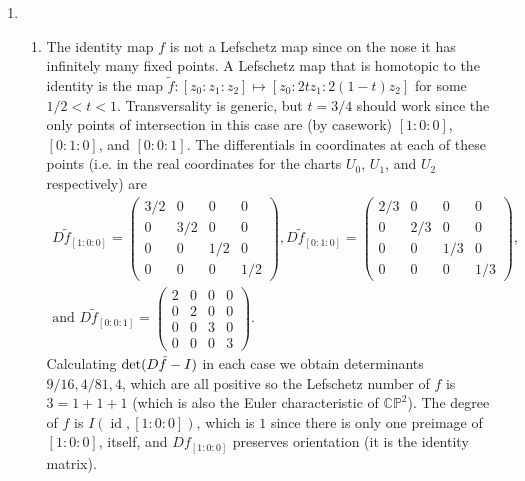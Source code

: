 \documentclass[11pt,leqno]{article}
\theoremstyle{plain}
\theoremstyle{definition}
\numberwithin{equation}{section}
\numberwithin{lem}{section}
\DeclareMathOperator{\id}{id}
\begin{document}
\begin{enumerate}
    \item \begin{enumerate}
        \item The identity map $f$ is not a Lefschetz map since on the nose it has infinitely many fixed points. A Lefschetz map that is homotopic to the identity is the map $\tilde f\colon [z_0:z_1:z_2]\mapsto [z_0:2tz_1:2(1-t)z_2]$ for some $1/2<t<1$. Transversality is generic, but $t = 3/4$ should work since the only points of intersection in this case are (by casework) $[1:0:0]$, $[0:1:0]$, and $[0:0:1]$. The differentials in coordinates at each of these points (i.e. in the real coordinates for the charts $U_0$, $U_1$, and $U_2$ respectively) are 
        \begin{multline*}
            D\tilde f_{[1:0:0]} = \begin{pmatrix}
                3/2 & 0 & 0 & 0 \\
                0 & 3/2 & 0 & 0 \\
                0 & 0 & 1/2 & 0 \\
                0 & 0 & 0 & 1/2
            \end{pmatrix}, D\tilde f_{[0:1:0]} = \begin{pmatrix}
                2/3 & 0 & 0 & 0 \\
                0 & 2/3 & 0 & 0 \\
                0 & 0 & 1/3 & 0 \\
                0 & 0 & 0 & 1/3
            \end{pmatrix}, \\ \text{and }D\tilde f_{[0:0:1]} = \begin{pmatrix}
                2 & 0 & 0 & 0 \\
                0 & 2 & 0 & 0 \\
                0 & 0 & 3 & 0 \\
                0 & 0 & 0 & 3
            \end{pmatrix}.
        \end{multline*}
        Calculating $\det\relax(D\tilde f-I)$ in each case we obtain determinants $9/16, 4/81, 4$, which are all positive so the Lefschetz number of $f$ is $3 = 1+ 1+ 1$ (which is also the Euler characteristic of $\mathbb{CP}^2$). The degree of $f$ is $I(\id, [1:0:0])$, which is $1$ since there is only one preimage of $[1:0:0]$, itself, and $Df_{[1:0:0]}$ preserves orientation (it is the identity matrix).


\end{enumerate}
\end{enumerate}
\end{document}
